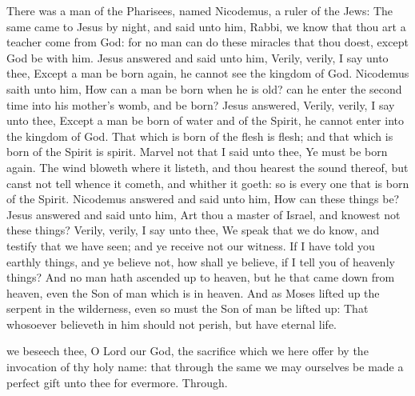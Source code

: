  There was a man of the Pharisees, named Nicodemus, a ruler of the Jews: The same came to Jesus by night, and said unto him, Rabbi, we know that thou art a teacher come from God: for no man can do these miracles that thou doest, except God be with him. Jesus answered and said unto him, Verily, verily, I say unto thee, Except a man be born again, he cannot see the kingdom of God. Nicodemus saith unto him, How can a man be born when he is old? can he enter the second time into his mother's womb, and be born? Jesus answered, Verily, verily, I say unto thee, Except a man be born of water and of the Spirit, he cannot enter into the kingdom of God. That which is born of the flesh is flesh; and that which is born of the Spirit is spirit. Marvel not that I said unto thee, Ye must be born again. The wind bloweth where it listeth, and thou hearest the sound thereof, but canst not tell whence it cometh, and whither it goeth: so is every one that is born of the Spirit. Nicodemus answered and said unto him, How can these things be? Jesus answered and said unto him, Art thou a master of Israel, and knowest not these things? Verily, verily, I say unto thee, We speak that we do know, and testify that we have seen; and ye receive not our witness. If I have told you earthly things, and ye believe not, how shall ye believe, if I tell you of heavenly things? And no man hath ascended up to heaven, but he that came down from heaven, even the Son of man which is in heaven. And as Moses lifted up the serpent in the wilderness, even so must the Son of man be lifted up: That whosoever believeth in him should not perish, but have eternal life.


\vspace{-0.5\baselineskip}

\secret
{} we beseech thee, O Lord our God, the sacrifice which we here offer by the invocation of thy holy name: that through the same we may ourselves be made a perfect gift unto thee for evermore. Through.
%


